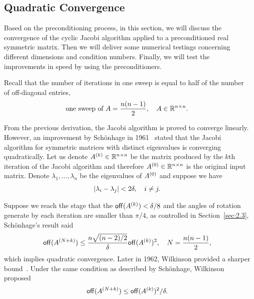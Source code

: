 \subsection{Quadratic Convergence}\label{sec:quadratic-conv}

Based on the preconditioning process, in this section, we will discuss the convergence of the cyclic Jacobi algorithm applied to a preconditioned real symmetric matrix. Then we will deliver some numerical testings concerning different dimensions and condition numbers. Finally, we will test the improvements in speed by using the preconditioners.

Recall that the number of iterations in one sweep is equal to half of the number of off-diagonal entries,
\begin{equation}\notag
  \text{one sweep of $A$} = \frac{n(n-1)}{2},\quad A \in\mathbb{R}^{n\times n}.
\end{equation}

From the previous derivation, the Jacobi algorithm is proved to converge linearly. However, an improvement by Sch{\"o}nhage in 1961~ stated that the Jacobi algorithm for symmetric matrices with distinct eigenvalues is converging quadratically. Let us denote $A^{(k)}\in\mathbb{R}^{n\times n}$ be the matrix produced by the $k$th iteration of the Jacobi algorithm and therefore $A^{(0)}\in\mathbb{R}^{n\times n}$ is the original input matrix. Denote $\lambda_1,\dots,\lambda_n$ be the eigenvalues of $A^{(0)}$ and suppose we have 
\begin{equation}
  \label{p3:eq:eig-distance}
  \lvert\lambda_i - \lambda_j\rvert < 2\delta,\quad i\neq j.
\end{equation}

Suppose we reach the stage that the $\mathsf{off}(A^{(k)}) < {\delta}/{8}$ and the angles of rotation generate by each iteration are smaller than $\pi/4$, as controlled in Section~\ref{sec:2.3}, Sch{\"o}nhage's result said 
\begin{equation}\notag
  \mathsf{off}(A^{(N+k)}) \leq \frac{n\sqrt{(n-2)/2}}{\delta}\mathsf{off}(A^{(k)})^2,\quad N = \frac{n(n-1)}{2},
\end{equation}
which implies quadratic convergence. Later in 1962, Wilkinson provided a sharper bound~. Under the same condition as described by Sch{\"o}nhage, Wilkinson proposed
\begin{equation}\notag
  \mathsf{off}(A^{(N+k)}) \leq \mathsf{off}(A^{(k)})^2 /\delta.
\end{equation}

